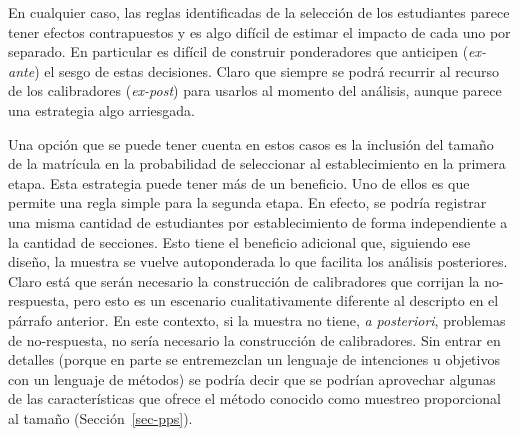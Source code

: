 \documentclass[
  spanish,
  a4paper,
]{scrreprt}
\begin{document}
\begin{table}

\caption{\label{tbl-matricula_size_seccion}Comparación de la media y
mediana de los establecimientos en función del tamaño de la sección (+-
10 estudiantes)}


\end{table}%

En cualquier caso, las reglas identificadas de la selección de los
estudiantes parece tener efectos contrapuestos y es algo difícil de
estimar el impacto de cada uno por separado. En particular es difícil de
construir ponderadores que anticipen (\emph{ex-ante}) el sesgo de estas
decisiones. Claro que siempre se podrá recurrir al recurso de los
calibradores (\emph{ex-post}) para usarlos al momento del análisis,
aunque parece una estrategia algo arriesgada.

Una opción que se puede tener cuenta en estos casos es la inclusión del
tamaño de la matrícula en la probabilidad de seleccionar al
establecimiento en la primera etapa. Esta estrategia puede tener más de
un beneficio. Uno de ellos es que permite una regla simple para la
segunda etapa. En efecto, se podría registrar una misma cantidad de
estudiantes por establecimiento de forma independiente a la cantidad de
secciones. Esto tiene el beneficio adicional que, siguiendo ese diseño,
la muestra se vuelve autoponderada lo que facilita los análisis
posteriores. Claro está que serán necesario la construcción de
calibradores que corrijan la no-respuesta, pero esto es un escenario
cualitativamente diferente al descripto en el párrafo anterior. En este
contexto, si la muestra no tiene, \emph{a posteriori}, problemas de
no-respuesta, no sería necesario la construcción de calibradores. Sin
entrar en detalles (porque en parte se entremezclan un lenguaje de
intenciones u objetivos con un lenguaje de métodos) se podría decir que
se podrían aprovechar algunas de las características que ofrece el
método conocido como muestreo proporcional al tamaño
(Sección~\ref{sec-pps}).
\end{document}
